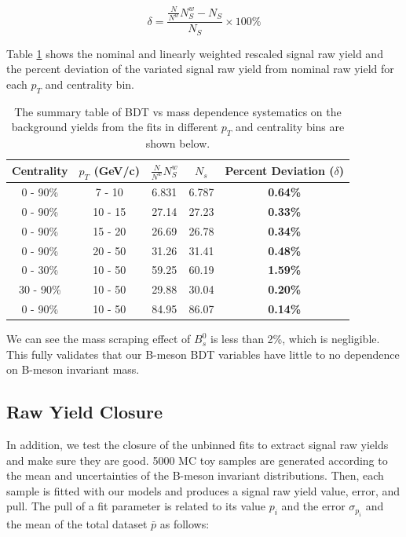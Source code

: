 \begin{equation}
\delta = \frac{\frac{N}{N^{w}} N^{w}_S - N_S}{N_S} \times 100\%
\end{equation}

Table \ref{MassScrapCheck} shows the nominal and linearly weighted rescaled signal raw yield and the percent deviation of the variated signal raw yield from nominal raw yield for each $p_T$ and centrality bin.

\begin{table}[h]
\begin{center}
\caption{The summary table of BDT vs mass dependence systematics on the background yields from the fits in different $p_T$ and centrality bins are shown below.}
\vspace{1em}
\label{MassScrapCheck}
  \begin{tabular}{ |c | c | c| c| c|}
        \hline
     Centrality &  $p_T$ (GeV/c) & $\frac{N}{N^{w}} N^{w}_S$ & $N_{s}$ & Percent Deviation ($\delta$)  \\
    \hline
    \hline
0 - 90\% & 7 - 10 & 6.831  & 6.787 & \textbf{0.64\%} \\ 
0 - 90\% & 10 - 15 &  27.14 & 27.23 & \textbf{0.33\%}  \\ 
0 - 90\% & 15 - 20 & 26.69   & 26.78  &   \textbf{0.34\%}\\ 
0 - 90\% & 20 - 50 &  31.26 &  31.41 &  \textbf{0.48\%}  \\ 
0 - 30\% & 10 - 50 & 59.25  &  60.19  &  \textbf{1.59\%}  \\ 
30 - 90\% & 10 - 50 & 29.88 & 30.04 &  \textbf{0.20\%}    \\ 
0 - 90\% & 10 - 50 & 84.95 & 86.07 &  \textbf{0.14\%}  \\ 
    \hline
\end{tabular}
\end{center}
\end{table}
 

We can see the mass scraping effect of $B^0_s$ is less than 2\%, which is negligible. This fully validates that our B-meson BDT variables have little to no dependence on B-meson invariant mass.

\subsection{Raw Yield Closure}

In addition, we test the closure of the unbinned fits to extract signal raw yields and make sure they are good. 5000 MC toy samples are generated according to the mean and uncertainties of the B-meson invariant distributions. Then, each sample is fitted with our models and produces a signal raw yield value, error, and pull. The pull of a fit parameter is related to its value $p_i$ and the error $\sigma_{p_i}$ and the mean of the total dataset $\bar p$ as follows:

